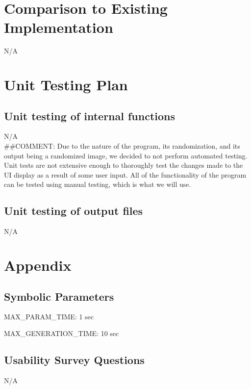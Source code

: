 \documentclass[12pt, titlepage]{article}
\begin{document}
\section{Comparison to Existing Implementation}	
N/A

\section{Unit Testing Plan}

\subsection{Unit testing of internal functions}
N/A\\
\color{red}\#\#COMMENT: Due to the nature of the program, its randomization, and its output being a randomized image, we decided to not perform automated testing. Unit tests are not extensive enough to thoroughly test the changes made to the UI display as a result of some user input. All of the functionality of the program can be tested using manual testing, which is what we will use.\color{black}

\subsection{Unit testing of output files}
N/A





\newpage

\section{Appendix}

\subsection{Symbolic Parameters}

MAX\_PARAM\_TIME: 1 sec

\noindent MAX\_GENERATION\_TIME: 10 sec

\subsection{Usability Survey Questions}

N/A
\end{document}
